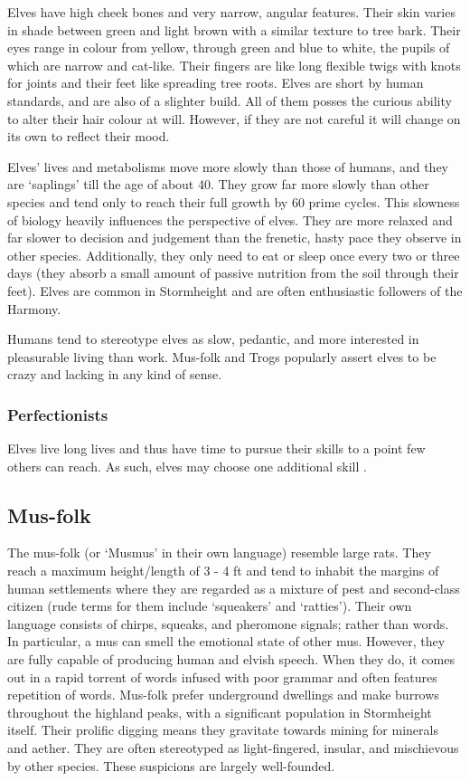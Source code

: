 \documentclass[a4paper,11pt,oneside]{book}
\newcommand{\textlf}[1]{\textbf{\titlecap{#1}}}
\begin{document}
Elves have high cheek bones and very narrow, angular features. Their skin varies in shade between green and light brown with a similar texture to tree bark. Their eyes range in colour from yellow, through green and blue to white, the pupils of which are narrow and cat-like. Their fingers are like long flexible twigs with knots for joints and their feet like spreading tree roots. Elves are short by human standards, and are also of a slighter build. All of them posses the curious ability to alter their hair colour at will. However, if they are not careful it will change on its own to reflect their mood. 

Elves' lives and metabolisms move more slowly than those of humans, and they are `saplings' till the age of about 40. They grow far more slowly than other species and tend only to reach their full growth by 60 prime cycles. This slowness of biology heavily influences the perspective of elves. They are more relaxed and far slower to decision and judgement than the frenetic, hasty pace they observe in other species. Additionally, they only need to eat or sleep once every two or three days (they absorb a small amount of passive nutrition from the soil through their feet). Elves are common in Stormheight and are often enthusiastic followers of the Harmony. 

Humans tend to stereotype elves as slow, pedantic, and more interested in pleasurable living than work. Mus-folk and Trogs popularly assert elves to be crazy and lacking in any kind of sense. 

\subsubsection*{Perfectionists}
Elves live long lives and thus have time to pursue their skills to a point few others can reach. As such, elves may choose one additional skill \textlf{proficiency}.


\subsection{Mus-folk}
The mus-folk (or `Musmus' in their own language) resemble large rats. They reach a maximum height/length of 3 - 4 ft and tend to inhabit the margins of human settlements where they are regarded as a mixture of pest and second-class citizen (rude terms for them include `squeakers' and `ratties'). Their own language consists of chirps, squeaks, and pheromone signals; rather than words. In particular, a mus can smell the emotional state of other mus. However, they are fully capable of producing human and elvish speech. When they do, it comes out in a rapid torrent of words infused with poor grammar and often features repetition of words. Mus-folk prefer underground dwellings and make burrows throughout the highland peaks, with a significant population in Stormheight itself. Their prolific digging means they gravitate towards mining for minerals and aether. They are often stereotyped as light-fingered, insular, and mischievous by other species. These suspicions are largely well-founded.
\end{document}
